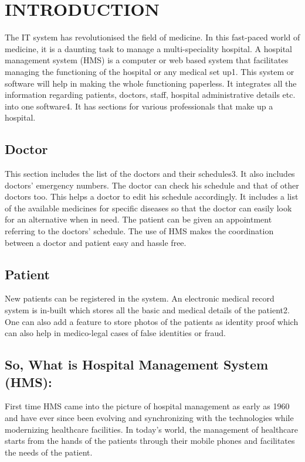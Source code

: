 \documentclass[a4paper, 14pt]{report}
\begin{document}
{\large
\newpage
\chapter{INTRODUCTION}
The IT system has revolutionised the field of medicine. In this fast-paced world of medicine, it is a daunting task to manage a multi-speciality hospital. A hospital management system (HMS) is a computer or web based system that facilitates managing the functioning of the hospital or any medical set up1. This system or software will help in making the whole functioning paperless. It integrates all the information regarding patients, doctors, staff, hospital administrative details etc. into one software4. It has sections for various professionals that make up a hospital.

\section{Doctor}

This section includes the list of the doctors and their schedules3. It also includes doctors’ emergency numbers. The doctor can check his schedule and that of other doctors too. This helps a doctor to edit his schedule accordingly. It includes a list of the available medicines for specific diseases so that the doctor can easily look for an alternative when in need. The patient can be given an appointment referring to the doctors’ schedule. The use of HMS makes the coordination between a doctor and patient easy and hassle free.


\section{Patient}

New patients can be registered in the system. An electronic medical record system is in-built which stores all the basic and medical details of the patient2. One can also add a feature to store photos of the patients as identity proof which can also help in medico-legal cases of false identities or fraud.

\newpage
\section{So, What is Hospital Management System (HMS):}

First time HMS came into the picture of hospital management as early as 1960 and have ever since been evolving and synchronizing with the technologies while modernizing healthcare facilities. In today’s world, the management of healthcare starts from the hands of the patients through their mobile phones and facilitates the needs of the patient.\\


}
\end{document}
